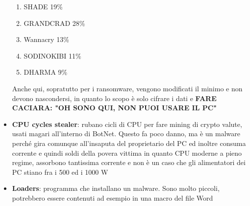 \documentclass[12pt, oneside]{extbook}
\begin{document}
\begin{itemize}
\begin{enumerate}
\item SHADE 19\%
\item GRANDCRAD 28\%
\item Wannacry 13\%
\item SODINOKIBI 11\%
\item DHARMA 9\%
\end{enumerate}
Anche qui, sopratutto per i ransomware, vengono modificati il minimo e non devono nascondersi, in quanto lo scopo è solo cifrare i dati e \textbf{\textsf{FARE CACIARA: "OH SONO QUI, NON PUOI USARE IL PC"}}
\item \textbf{CPU cycles stealer}: rubano cicli di CPU per fare mining di crypto valute, usati magari all'interno di BotNet. Questo fa poco danno, ma è un malware perché gira comunque all'insaputa del proprietario del PC ed inoltre consuma corrente e quindi soldi della povera vittima in quanto CPU moderne a pieno regime, assorbono tantissima corrente e non è un caso che gli alimentatori dei PC stiano fra i 500 ed i 1000 W
\item \textbf{Loaders}: programma che installano un malware. Sono molto piccoli, potrebbero essere contenuti ad esempio in una macro del file Word
\end{itemize}
\end{document}
